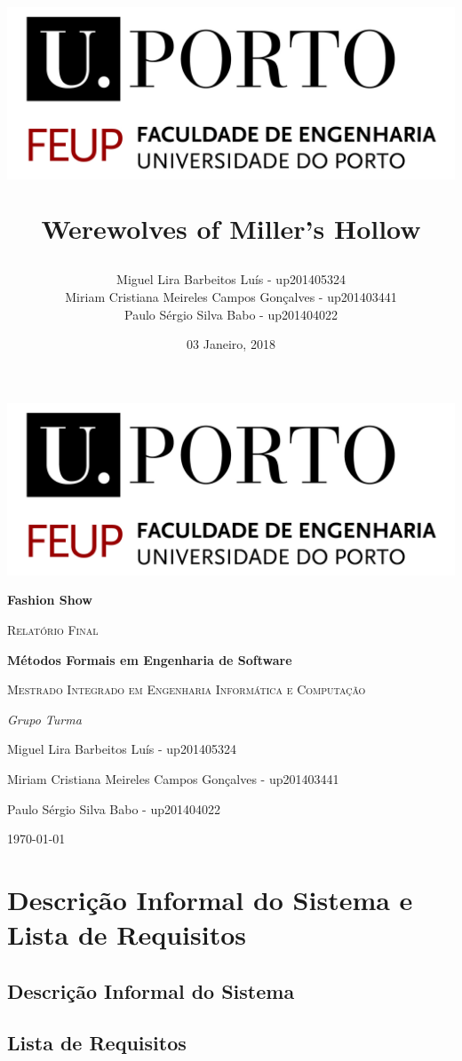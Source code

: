 \documentclass{article}
\title{ \begin{center}
					\includegraphics[scale=0.6]{./images/FEUPlogo}
				\end{center}
				\textbf{Werewolves of Miller's Hollow}}
\author{Miguel Lira Barbeitos Luís - up201405324\\
		Miriam Cristiana Meireles Campos Gonçalves - up201403441\\
		Paulo Sérgio Silva Babo - up201404022}
\date{03 Janeiro, 2018}
\begin{document}
\begin{titlepage}
	\centering
	\includegraphics[width=1\textwidth]{./images/FEUPlogo}\par\vspace{1cm}
	{\huge\bfseries Fashion Show \par}
	\vspace{2cm}
	{\scshape\Large Relatório Final\par}
	\vspace{1.5cm}
	{\large\bfseries Métodos Formais em Engenharia de Software\par}
	\vspace{0.7cm}
	{\scshape\normalsize  Mestrado Integrado em Engenharia Informática e Computação \par}
	\vspace{1.5cm}
	{\Large\itshape Grupo Turma 
	\par Miguel Lira Barbeitos Luís - up201405324 \par
	Miriam Cristiana Meireles Campos Gonçalves - up201403441 \par
	Paulo Sérgio Silva Babo - up201404022\par}

	\vfill
	{\large \today\par}
\end{titlepage}
\thispagestyle{empty}

\newpage

\tableofcontents

\newpage

\section{Descrição Informal do Sistema e Lista de Requisitos}
\subsection{Descrição Informal do Sistema}
\subsection{Lista de Requisitos}
\end{document}
